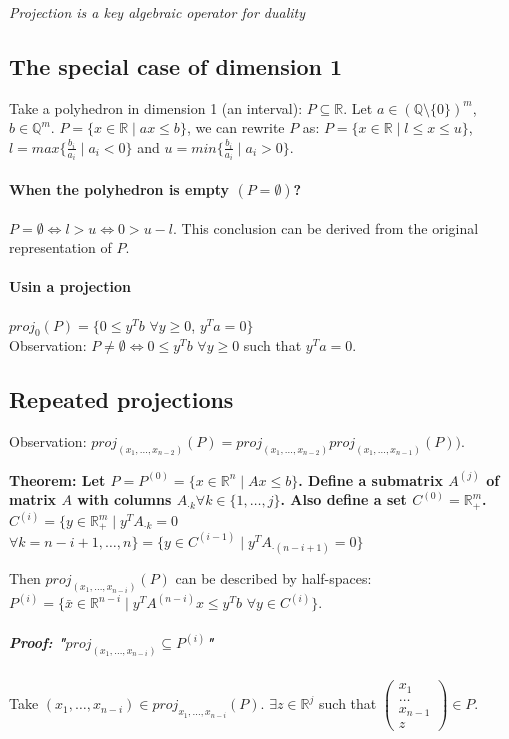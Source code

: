\documentclass[main]{subfiles}
\begin{document}
\emph{Projection is a key algebraic operator for duality}

\subsection{The special case of dimension 1}
Take a polyhedron in dimension 1 (an interval): $P \subseteq \mathbb{R}$.
Let $a \in (\mathbb{Q}\setminus \{0\})^m$, $b \in \mathbb{Q}^m$. $P = \{ x \in
\mathbb{R} \mid ax \leq b \}$, we can rewrite $P$ as: $P = \{ x \in \mathbb{R}
\mid l \leq x \leq u \}$, $l = max \{ \frac{b_i}{a_i} \mid a_i < 0 \}$ and $u =
min \{ \frac{b_i}{a_i} \mid a_i > 0 \}$.

\paragraph{When the polyhedron is empty $(P = \emptyset)$?}
$P = \emptyset \iff l > u \iff 0 > u-l$. This conclusion can be derived from
the original representation of $P$.

\paragraph{Usin a projection}
$proj_{0}(P) = \{ 0 \leq y^T b$ $\forall y \geq 0$, $y^T a = 0 \}$ \\
Observation: $P \neq \emptyset \iff 0 \leq y^T b$ $\forall y \geq 0$ such that
$y^T a = 0$.

\subsection{Repeated projections}
Observation: $proj_{(x_1, \dots, x_{n-2})}(P) = proj_{(x_1, \dots, x_{n-2})}
proj_{(x_1, \dots, x_{n-1})}(P))$.

\textbf{Theorem: Let $P = P^{(0)} = \{ x \in \mathbb{R}^n \mid Ax \leq b \}$.
Define a submatrix $A^{(j)}$ of matrix $A$ with columns $A_{\cdot k} \forall k
\in \{1, \dots, j\}$. Also define a set $C^{(0)} = \mathbb{R}_+^m$. $C^{(i)} =
\{ y \in \mathbb{R}_+^m \mid y^T A_{\cdot k} = 0$ $\forall k = n-i+1, \dots, n
\} = \{y \in C^{(i-1)} \mid y^T A_{\cdot (n-i+1)} = 0\}$ }

Then $proj_{(x_1, \dots, x_{n-i})}(P)$ can be described by half-spaces:
$P^{(i)} = \{ \bar{x} \in \mathbb{R}^{n-i} \mid y^T A^{(n-i)}x \leq y^T b$
$\forall y \in C^{(i)} \}$.

\subparagraph{Proof: "$proj_{(x_1, \dots, x_{n-i})} \subseteq P^{(i)}$"}
Take $(x_1, \dots, x_{n-i}) \in proj_{x_1, \dots, x_{n-i}}(P).$ $\exists z \in
\mathbb{R}^j$ such that
$\begin{pmatrix}
	x_1 \\
    \dots \\
    x_{n-1} \\
    z
\end{pmatrix} \in P$.
\end{document}
